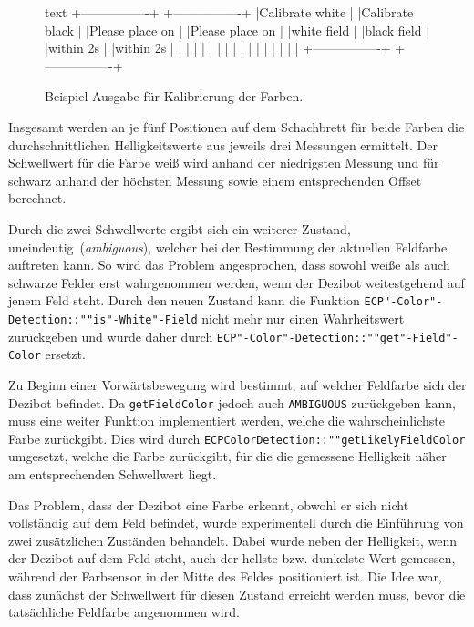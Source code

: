 {\begin{figure}[h]
\centering
\begin{cminted}{text}
+----------------+    +----------------+
|Calibrate white |    |Calibrate black |
|Please place on |    |Please place on |
|white field     |    |black field     |
|within 2s       |    |within 2s       |
|                |    |                |
|                |    |                |
|                |    |                |
|                |    |                |
+----------------+    +----------------+
\end{cminted}
\caption{Beispiel-Ausgabe für Kalibrierung der Farben.}
\label{fig:colour-calibration-display-print}
\end{figure}

Insgesamt werden an je fünf Positionen auf dem Schachbrett für beide Farben die durchschnittlichen Helligkeitswerte aus jeweils drei Messungen ermittelt. Der Schwellwert für die Farbe weiß wird anhand der niedrigsten Messung und für schwarz anhand der höchsten Messung sowie einem entsprechenden Offset berechnet.


Durch die zwei Schwellwerte ergibt sich ein weiterer Zustand, uneindeutig~(\emph{ambiguous}), welcher bei der Bestimmung der aktuellen Feldfarbe auftreten kann. So wird das Problem angesprochen, dass sowohl weiße als auch schwarze Felder erst wahrgenommen werden, wenn der Dezibot weitestgehend auf jenem Feld steht. Durch den neuen Zustand kann die Funktion \texttt{ECP"-Color"-Detection::""is"-White"-Field} nicht mehr nur einen Wahrheitswert zurückgeben und wurde daher durch \texttt{ECP"-Color"-Detection::""get"-Field"-Color} ersetzt.

Zu Beginn einer Vorwärtsbewegung wird bestimmt, auf welcher Feldfarbe sich der Dezibot befindet. Da \texttt{get\-Field\-Color} jedoch auch \texttt{AMBIGUOUS} zurückgeben kann, muss eine weiter Funktion implementiert werden, welche die wahrscheinlichste Farbe zurückgibt. Dies wird durch \texttt{ECP\-Color\-Detection::""get\-Likely\-Field\-Color} umgesetzt, welche die Farbe zurückgibt, für die die gemessene Helligkeit näher am entsprechenden Schwellwert liegt.

Das Problem, dass der Dezibot eine Farbe erkennt, obwohl er sich nicht vollständig auf dem Feld befindet, wurde experimentell durch die Einführung von zwei zusätzlichen Zuständen behandelt. Dabei wurde neben der Helligkeit, wenn der Dezibot auf dem Feld steht, auch der hellste bzw. dunkelste Wert gemessen, während der Farbsensor in der Mitte des Feldes positioniert ist. Die Idee war, dass zunächst der Schwellwert für diesen Zustand erreicht werden muss, bevor die tatsächliche Feldfarbe angenommen wird.

}
